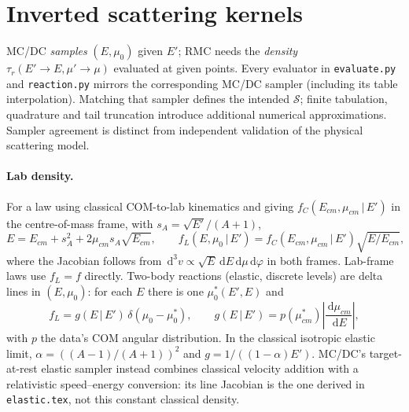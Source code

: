 \documentclass[11pt]{article}
\newcommand{\dd}{\,\mathrm{d}}
\begin{document}
\section{Inverted scattering kernels}

MC/DC \emph{samples} $(E,\mu_0)$ given $E'$; RMC needs the \emph{density}
$\tau_r(E'\to E,\mu'\to\mu)$ evaluated at given points. Every evaluator in
\texttt{evaluate.py} and \texttt{reaction.py} mirrors the corresponding MC/DC sampler
(including its table interpolation). Matching that sampler defines the intended
$\mathcal S$; finite tabulation, quadrature and tail truncation introduce additional
numerical approximations. Sampler agreement is distinct from independent validation
of the physical scattering model.

\paragraph{Lab density.} For a law using classical COM-to-lab kinematics and giving
$f_C(E_{cm},\mu_{cm}\,|\,E')$ in the
centre-of-mass frame, with $s_A=\sqrt{E'}/(A+1)$,
\begin{equation}
  E=E_{cm}+s_A^2+2\mu_{cm}s_A\sqrt{E_{cm}},\qquad
  f_L(E,\mu_0\,|\,E')=f_C(E_{cm},\mu_{cm}\,|\,E')\sqrt{E/E_{cm}} ,
\end{equation}
where the Jacobian follows from $\dd^3v\propto\sqrt{E}\dd E\dd\mu\dd\varphi$ in both
frames. Lab-frame laws use $f_L=f$ directly. Two-body reactions (elastic, discrete
levels) are delta lines in $(E,\mu_0)$: for each $E$ there is one $\mu_0^*(E',E)$ and
\begin{equation}
  f_L=g(E\,|\,E')\,\delta(\mu_0-\mu_0^*),\qquad
  g(E\,|\,E')=p(\mu_{cm}^*)\left|\frac{\dd\mu_{cm}}{\dd E}\right|,
\end{equation}
with $p$ the data's COM angular distribution. In the classical isotropic elastic
limit, $\alpha=((A-1)/(A+1))^2$ and $g=1/((1-\alpha)E')$.
MC/DC's target-at-rest elastic sampler instead combines classical velocity addition
with a relativistic speed--energy conversion: its line Jacobian is the one derived
in \texttt{elastic.tex}, not this constant classical density.
\end{document}
